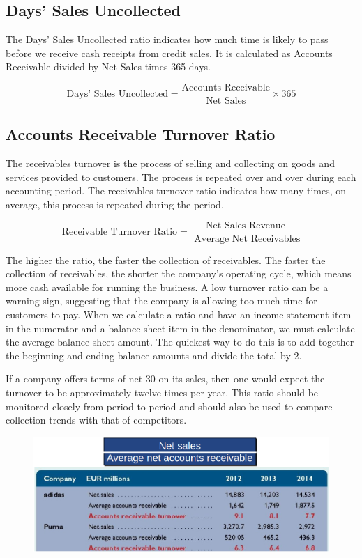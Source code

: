 \documentclass[../main.tex]{subfiles}
\begin{document}
	\subsection{Days' Sales Uncollected}
	
	The Days’ Sales Uncollected ratio indicates how much time is likely to pass before we receive cash 
	receipts from credit sales. It is calculated as Accounts Receivable divided by Net Sales times 365 
	days.
	
	\[
	\text{Days' Sales Uncollected} = \frac{\text{Accounts Receivable}}{\text{Net Sales}} \times 365
	\]
	
	
	\subsection{Accounts Receivable Turnover Ratio}
	
	The receivables turnover is the process of selling and collecting on goods 
	and services provided to customers. The process is repeated over and over 
	during each accounting period. The receivables turnover ratio indicates how 
	many times, on average, this process is repeated during the period. 
	
	\[
	\text{Receivable Turnover Ratio} =\frac{\text { Net Sales Revenue }}{\text 
	{ Average Net Receivables}}
	\]
	
	The higher the ratio, the faster the collection of receivables. The faster 
	the collection of receivables, the shorter the company’s operating cycle, 
	which means more cash available for running the business. A low turnover 
	ratio can be a warning sign, suggesting that the company is allowing too 
	much time for customers to pay. When we calculate a ratio and have an 
	income statement item in the numerator and a balance sheet item in the 
	denominator, we must calculate the average balance sheet amount. The 
	quickest way to do this is to add together the beginning and ending balance 
	amounts and divide the total by 2.
	
	If a company offers terms of net 30 on its sales, then one would expect the 
	turnover to be approximately twelve times per year. This ratio should be 
	monitored closely from period to period and should also be used to compare 
	collection trends with that of competitors. 
	
	\begin{figure}[ht]
		\centering
		\includegraphics[width=1\columnwidth]{images/c6/turnover_ratio_eg.png}
	\end{figure}
	
\end{document}
